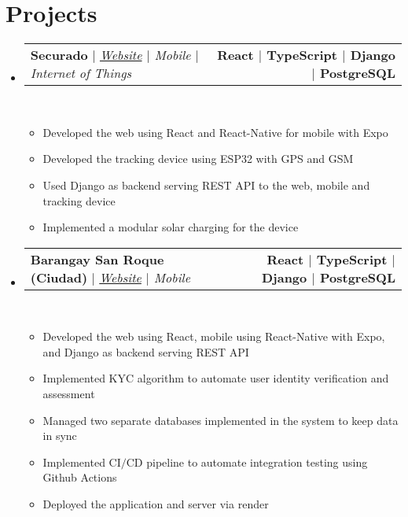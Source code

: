 \documentclass[letterpaper,11pt]{article}
\makeatletter
\newcommand{\resumeItem}[1]{
  \item\small{
    {#1 \vspace{0pt}}
  }
}
\newcommand{\resumeProjectHeading}[2]{
    \item
    \begin{tabular*}{1.001\textwidth}{l@{\extracolsep{\fill}}r}
      \small#1 & \textbf{\small #2}\\
    \end{tabular*}\vspace{-7pt}
}
\newcommand{\resumeSubHeadingListStart}{\begin{itemize}[leftmargin=0.0in, label={}]}
\newcommand{\resumeSubHeadingListEnd}{\end{itemize}}\vspace{0pt}
\newcommand{\resumeItemListStart}{\begin{itemize}}
\newcommand{\resumeItemListEnd}{\end{itemize}\vspace{-5pt}}
\makeatother
\begin{document}
\section{Projects} 
    \vspace{-5pt}
    \resumeSubHeadingListStart
    \resumeProjectHeading
            {\textbf{{Securado}} $|$ \emph{\href{https://mcgillscheduler.vercel.app/}{Website} {$|$} {Mobile} {$|$} {Internet of Things}}}{React $|$ TypeScript $|$ Django $|$ PostgreSQL}
            \\[5mm]
          \resumeItemListStart
            \resumeItem{Developed the web using React and React-Native for mobile with Expo}
            \resumeItem{Developed the tracking device using ESP32 with GPS and GSM}
            \resumeItem{Used Django as backend serving REST API to the web, mobile and tracking device}
            \resumeItem{Implemented a modular solar charging for the device}
          \resumeItemListEnd
    \vspace{-20pt}
    \resumeProjectHeading
            {\textbf{{Barangay San Roque (Ciudad)}} $|$ \emph{\href{hthttps://www.sanroqueciudad.com/}{Website} {$|$} {Mobile}}}{React $|$ TypeScript $|$ Django $|$ PostgreSQL}
            \\[5mm]
          \resumeItemListStart
            \resumeItem{Developed the web using React, mobile using React-Native with Expo, and Django as backend serving REST API}
            \resumeItem{Implemented KYC algorithm to automate user identity verification and assessment}
            \resumeItem{Managed two separate databases implemented in the system to keep data in sync} 
            \resumeItem{Implemented CI{$/$}CD pipeline to automate integration testing using Github Actions}
            \resumeItem{Deployed the application and server via render} 
          \resumeItemListEnd
\resumeSubHeadingListEnd
\vspace{-12pt}
\end{document}
